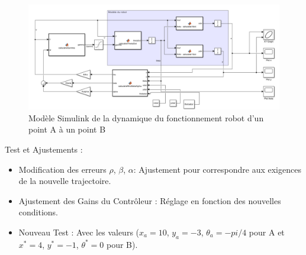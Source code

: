 \FloatBarrier

\begin{figure}[!h]
    \centering
    \includegraphics[width=1.0\textwidth]{img/diagrams/6} 
    \caption{Modèle Simulink de la dynamique du fonctionnement robot d’un point A à un point B}
    \label{img:simulink2}
\end{figure}

Test et Ajustements :
\begin{itemize}
    \item Modification des erreurs $\rho$, $\beta$, $\alpha$: Ajustement pour correspondre aux exigences de la nouvelle trajectoire.
    \item Ajustement des Gains du Contrôleur : Réglage en fonction des nouvelles conditions.
    \item Nouveau Test : Avec les valeurs ($x_a = 10$, $y_a = -3$, $\theta_a = -pi/4$ pour A et $x^* = 4$, $y^* = -1$, $\theta^* = 0$ pour B).
\end{itemize}











